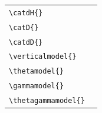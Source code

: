 {\begin{xltabular}{\linewidth}{X|X}
		\verb|\catdH{}|                     & \catdH{}                                                        \\
		\verb|\catD{}|                      & \catD{}                                                         \\
		\verb|\catdD{}|                     & \catdD{}                                                        \\
		\verb|\verticalmodel{}|             & \verticalmodel{}                                                \\
		\verb|\thetamodel{}|                & \thetamodel{}                                                   \\
		\verb|\gammamodel{}|                & \gammamodel{}                                                   \\
		\verb|\thetagammamodel{}|           & \thetagammamodel{}                                              \\
	\end{xltabular}
}
